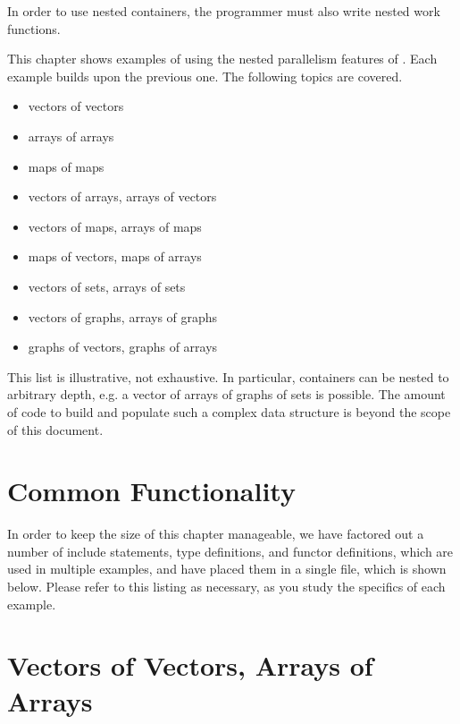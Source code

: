 \documentclass{report}
\begin{document}
In order to use nested containers, the programmer must also write nested
work functions.

This chapter shows examples of using the nested parallelism
features of \stapl.  Each example builds upon the previous one.
The following topics are covered.

\begin{itemize}
\item
vectors of vectors
\item
arrays of arrays
\item
maps of maps
\item
vectors of arrays, arrays of vectors
\item
vectors of maps, arrays of maps
\item
maps of vectors, maps of arrays
\item
vectors of sets, arrays of sets
\item
vectors of graphs, arrays of graphs
\item
graphs of vectors, graphs of arrays
\end{itemize}

This list is illustrative, not exhaustive.  In particular, containers
can be nested to arbitrary depth, e.g. a vector of arrays of graphs of sets
is possible.  The amount of code to build and populate such a complex
data structure is beyond the scope of this document.


\section{Common Functionality}

In order to keep the size of this chapter manageable, we have factored
out a number of include statements, type definitions, and functor
definitions, which are used in multiple examples, and have placed them
in a single file, which is shown below.  Please refer to this listing
as necessary, as you study the specifics of each example.



\pagebreak


\pagebreak
\section{Vectors of Vectors, Arrays of Arrays}
\end{document}
